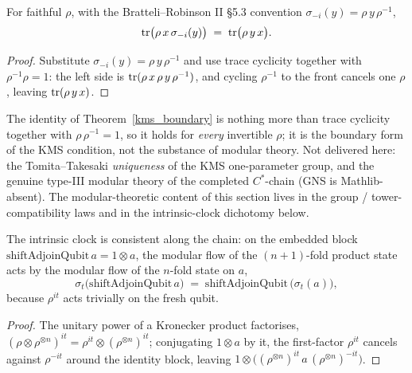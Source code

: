 \begin{theorem}[The \(\beta=1\) KMS boundary identity]\label{kms_boundary}
  \leanok
  For faithful \(\rho\), with the Bratteli--Robinson II \S5.3 convention
  \(\sigma_{-i}(y)=\rho\,y\,\rho^{-1}\),
  \[
    \operatorname{tr}\bigl(\rho\,x\,\sigma_{-i}(y)\bigr) \;=\; \operatorname{tr}\bigl(\rho\,y\,x\bigr).
  \]
\end{theorem}
\begin{proof}\leanok
  Substitute \(\sigma_{-i}(y)=\rho\,y\,\rho^{-1}\) and use trace cyclicity together with
  \(\rho^{-1}\rho=1\): the left side is \(\operatorname{tr}(\rho\,x\,\rho\,y\,\rho^{-1})\), and cycling \(\rho^{-1}\)
  to the front cancels one \(\rho\), leaving \(\operatorname{tr}(\rho\,y\,x)\).
\end{proof}

\begin{remark}\label{qbs-scope-kms}
  The identity of Theorem~\ref{kms_boundary} is nothing more than trace cyclicity together with
  \(\rho\,\rho^{-1}=1\), so it holds for \emph{every} invertible \(\rho\); it is the boundary form of
  the KMS condition, not the substance of modular theory. Not delivered here: the Tomita--Takesaki
  \emph{uniqueness} of the KMS one-parameter group, and the genuine type-III modular theory of the
  completed \(C^{*}\)-chain (GNS is Mathlib-absent). The modular-theoretic content of this section
  lives in the group / tower-compatibility laws and in the intrinsic-clock dichotomy below.
\end{remark}

\begin{theorem}\label{modAut_shiftAdjoinQubit}
  \leanok
  The intrinsic clock is consistent along the chain: on the embedded block
  \(\mathrm{shiftAdjoinQubit}\,a=1\otimes a\), the modular flow of the \((n+1)\)-fold product state
  acts by the modular flow of the \(n\)-fold state on \(a\),
  \[
    \sigma_t\bigl(\mathrm{shiftAdjoinQubit}\,a\bigr)
      \;=\; \mathrm{shiftAdjoinQubit}\,\bigl(\sigma_t(a)\bigr),
  \]
  because \(\rho^{it}\) acts trivially on the fresh qubit.
\end{theorem}
\begin{proof}\leanok
  The unitary power of a Kronecker product factorises, \((\rho\otimes\rho^{\otimes n})^{it}
  =\rho^{it}\otimes(\rho^{\otimes n})^{it}\); conjugating \(1\otimes a\) by it, the first-factor
  \(\rho^{it}\) cancels against \(\rho^{-it}\) around the identity block, leaving
  \(1\otimes\bigl((\rho^{\otimes n})^{it}\,a\,(\rho^{\otimes n})^{-it}\bigr)\).
\end{proof}

